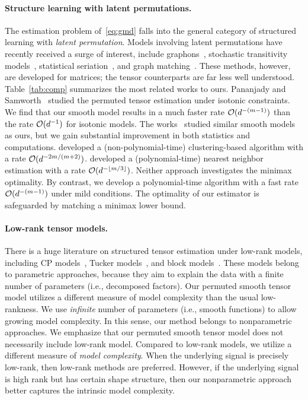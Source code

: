 \documentclass[12pt]{article}
\theoremstyle{definition}
\begin{document}
\paragraph{Structure learning with latent permutations.} The estimation problem of~\eqref{eq:gmd} falls into the general category of structured learning with \emph{latent permutation}. Models involving latent permutations have recently received a surge of interest, include graphons~\citep{chan2014consistent,klopp2017oracle}, stochastic transitivity models~\citep{chatterjee2015matrix,shah2019low}, statistical seriation~\citep{flammarion2019optimal}, and graph matching~\citep{ding2021efficient}. These methods, however, are developed for matrices; the tensor counterparts are far less well understood. Table~\ref{tab:comp} summarizes the most related works to ours. Pananjady and Samworth~\cite{pananjady2022isotonic} studied the permuted tensor estimation under isotonic constraints.  We find that our smooth model results in a much faster rate $\mathcal{O}(d^{-(m-1)})$ than the rate $\mathcal{O}(d^{-1})$ for isotonic models. The works~\cite{balasubramanian2021nonparametric,li2019nearest} studied similar smooth models as ours, but we gain substantial improvement in both statistics and computations. \citet{balasubramanian2021nonparametric} developed a (non-polynomial-time) clustering-based algorithm with a rate $\mathcal{O}(d^{-2m/(m+2)})$. \citet{li2019nearest} developed a (polynomial-time) nearest neighbor estimation with a rate $\mathcal{O}(d^{-\lfloor m/3\rfloor})$. Neither approach investigates the minimax optimality. By contrast, we develop a polynomial-time algorithm with a fast rate $\mathcal{O}(d^{-(m-1)})$ under mild conditions. The optimality of our estimator is safeguarded by matching a minimax lower bound. 


\paragraph{Low-rank tensor models.} There is a huge literature on structured tensor estimation under low-rank models, including CP models~\cite{kolda2009tensor}, Tucker models~\cite{zhang2018tensor}, and block models~\cite{wang2019multiway}. These models belong to parametric approaches, because they aim to explain the data with a finite number of parameters (i.e., decomposed factors). Our permuted smooth tensor model utilizes a different measure of model complexity than the usual low-rankness. We use \emph{infinite} number of parameters (i.e., smooth functions) to allow growing model complexity. In this sense, our method belongs to nonparametric approaches. {\color{blue}We emphasize that our permuted smooth tensor model does not necessarily include low-rank model. Compared to low-rank models, we utilize a different measure of \emph{model complexity}.
When the underlying signal is precisely low-rank, then low-rank methods are preferred. However, if the underlying signal is high rank but has certain shape structure, then our nonparametric approach better captures the intrinsic model complexity. }
 
\end{document}
